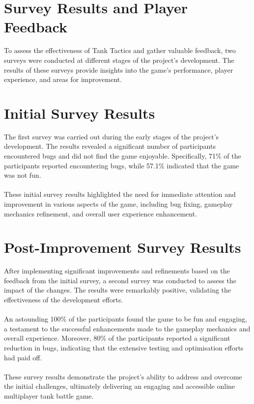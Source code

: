 \section{Survey Results and Player Feedback}
To assess the effectiveness of Tank Tactics and gather valuable feedback, two surveys were conducted at different stages of the project's development. The results of these surveys provide insights into the game's performance, player experience, and areas for improvement.

\section{Initial Survey Results}
The first survey was carried out during the early stages of the project's development. The results revealed a significant number of participants encountered bugs and did not find the game enjoyable. Specifically, 71\% of the participants reported encountering bugs, while 57.1\% indicated that the game was not fun.
\\
\noindent
\\
These initial survey results highlighted the need for immediate attention and improvement in various aspects of the game, including bug fixing, gameplay mechanics refinement, and overall user experience enhancement.

\section{Post-Improvement Survey Results}
After implementing significant improvements and refinements based on the feedback from the initial survey, a second survey was conducted to assess the impact of the changes. The results were remarkably positive, validating the effectiveness of the development efforts.
\\
\noindent
\\
An astounding 100\% of the participants found the game to be fun and engaging, a testament to the successful enhancements made to the gameplay mechanics and overall experience. Moreover, 80\% of the participants reported a significant reduction in bugs, indicating that the extensive testing and optimisation efforts had paid off.
\\
\noindent
\\
These survey results demonstrate the project's ability to address and overcome the initial challenges, ultimately delivering an engaging and accessible online multiplayer tank battle game.


